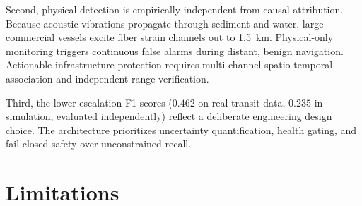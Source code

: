\documentclass[conference]{IEEEtran}
\begin{document}
Second, physical detection is empirically independent from causal attribution. Because acoustic vibrations propagate through sediment and water, large commercial vessels excite fiber strain channels out to 1.5~km. Physical-only monitoring triggers continuous false alarms during distant, benign navigation. Actionable infrastructure protection requires multi-channel spatio-temporal association and independent range verification.

Third, the lower escalation F1 scores ($0.462$ on real transit data, $0.235$ in simulation, evaluated independently) reflect a deliberate engineering design choice. The architecture prioritizes uncertainty quantification, health gating, and fail-closed safety over unconstrained recall.

\section{Limitations}
\label{sec:limitations}
\end{document}
